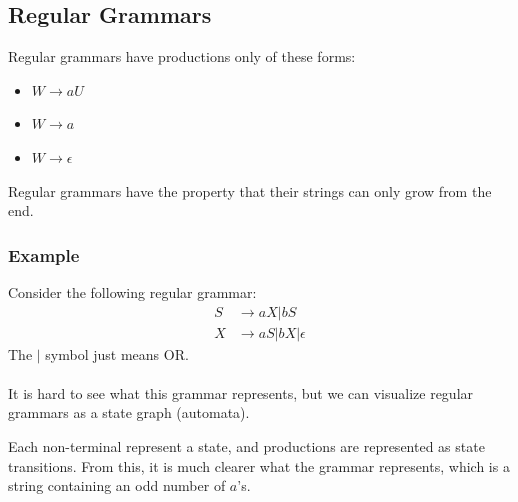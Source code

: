 \documentclass[10pt]{article}
\begin{document}
\subsection*{Regular Grammars}
Regular grammars have productions only of these forms:
\begin{itemize}
    \item $W \rightarrow aU$ 
    \item $W \rightarrow a$ 
    \item $W \rightarrow \epsilon$
\end{itemize}
Regular grammars have the property that their strings can only grow from the end.

\subsubsection*{Example}
Consider the following regular grammar:
\begin{align*}
    S &\rightarrow aX | bS \\
    X &\rightarrow aS | bX | \epsilon
\end{align*}
The $|$ symbol just means OR.  \\\\
It is hard to see what this grammar represents, but we can visualize regular grammars as a state graph (automata).
\begin{center}
\end{center}
Each non-terminal represent a state, and productions are represented as state transitions.
From this, it is much clearer what the grammar represents, which is a string containing an odd number of $a$'s.
\end{document}
